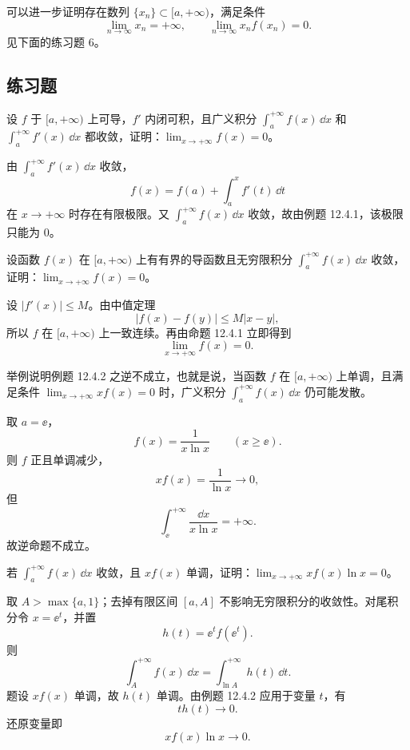\begin{xremark}
可以进一步证明存在数列 $\{x_n\}\subset[a,+\infty)$，满足条件
\[
  \lim_{n\to\infty}x_n=+\infty,\qquad
  \lim_{n\to\infty}x_nf(x_n)=0.
\]
见下面的练习题 6。
\end{xremark}

\subsection{练习题}

\begin{xexercise}[1]
设 $f$ 于 $[a,+\infty)$ 上可导，$f'$ 内闭可积，且广义积分 $\int_a^{+\infty}f(x)\,\dd x$ 和 $\int_a^{+\infty}f'(x)\,\dd x$ 都收敛，证明：$\lim_{x\to+\infty}f(x)=0$。
\end{xexercise}
\begin{xsolution}
由 $\int_a^{+\infty}f'(x)\,\dd x$ 收敛，
\[
  f(x)=f(a)+\int_a^x f'(t)\,\dd t
\]
在 $x\to+\infty$ 时存在有限极限。又 $\int_a^{+\infty}f(x)\,\dd x$ 收敛，故由例题 12.4.1，该极限只能为 $0$。
\end{xsolution}


\begin{xexercise}[2]
设函数 $f(x)$ 在 $[a,+\infty)$ 上有有界的导函数且无穷限积分 $\int_a^{+\infty}f(x)\,\dd x$ 收敛，证明：$\lim_{x\to+\infty}f(x)=0$。
\end{xexercise}
\begin{xsolution}
设 $|f'(x)|\leq M$。由中值定理
\[
  |f(x)-f(y)|\leq M|x-y|,
\]
所以 $f$ 在 $[a,+\infty)$ 上一致连续。再由命题 12.4.1 立即得到
\[
  \boxed{\lim_{x\to+\infty}f(x)=0}.
\]
\end{xsolution}


\begin{xexercise}[3]
举例说明例题 12.4.2 之逆不成立，也就是说，当函数 $f$ 在 $[a,+\infty)$ 上单调，且满足条件 $\lim_{x\to+\infty}xf(x)=0$ 时，广义积分 $\int_a^{+\infty}f(x)\,\dd x$ 仍可能发散。
\end{xexercise}
\begin{xsolution}
取 $a=\ee$，
\[
  f(x)=\frac1{x\ln x}\qquad(x\geq\ee).
\]
则 $f$ 正且单调减少，
\[
  xf(x)=\frac1{\ln x}\to0,
\]
但
\[
  \int_\ee^{+\infty}\frac{\dd x}{x\ln x}=+\infty.
\]
故逆命题不成立。
\end{xsolution}


\begin{xexercise}[4]
若 $\int_a^{+\infty}f(x)\,\dd x$ 收敛，且 $xf(x)$ 单调，证明：$\lim_{x\to+\infty}xf(x)\ln x=0$。
\end{xexercise}
\begin{xsolution}
取 $A>\max\{a,1\}$；去掉有限区间 $[a,A]$ 不影响无穷限积分的收敛性。对尾积分令 $x=\ee^t$，并置
\[
  h(t)=\ee^t f(\ee^t).
\]
则
\[
  \int_A^{+\infty}f(x)\,\dd x
  =\int_{\ln A}^{+\infty}h(t)\,\dd t.
\]
题设 $xf(x)$ 单调，故 $h(t)$ 单调。由例题 12.4.2 应用于变量 $t$，有
\[
  t h(t)\to0.
\]
还原变量即
\[
  \boxed{xf(x)\ln x\to0}.
\]
\end{xsolution}


